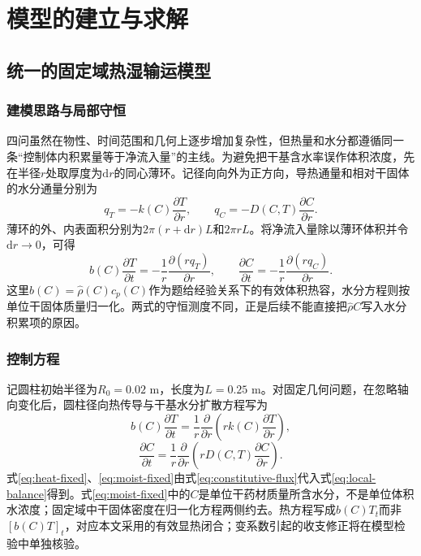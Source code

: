 \newpage
\section{模型的建立与求解}

\subsection{统一的固定域热湿输运模型}

\subsubsection{建模思路与局部守恒}

四问虽然在物性、时间范围和几何上逐步增加复杂性，但热量和水分都遵循同一条“控制体内积累量等于净流入量”的主线。为避免把干基含水率误作体积浓度，先在半径$r$处取厚度为$\mathrm dr$的同心薄环。记径向向外为正方向，导热通量和相对干固体的水分通量分别为
\begin{equation}
q_T=-k(C)\frac{\partial T}{\partial r},\qquad
q_C=-D(C,T)\frac{\partial C}{\partial r}.
\label{eq:constitutive-flux}
\end{equation}
薄环的外、内表面积分别为$2\pi(r+\mathrm dr)L$和$2\pi rL$。将净流入量除以薄环体积并令$\mathrm dr\to0$，可得
\begin{equation}
b(C)\frac{\partial T}{\partial t}
=-\frac{1}{r}\frac{\partial(rq_T)}{\partial r},\qquad
\frac{\partial C}{\partial t}
=-\frac{1}{r}\frac{\partial(rq_C)}{\partial r}.
\label{eq:local-balance}
\end{equation}
这里$b(C)=\hat\rho(C)c_p(C)$作为题给经验关系下的有效体积热容，水分方程则按单位干固体质量归一化。两式的守恒测度不同，正是后续不能直接把$\hat\rho C$写入水分积累项的原因。

\subsubsection{控制方程}

记圆柱初始半径为$R_0=0.02$ m，长度为$L=0.25$ m。对固定几何问题，在忽略轴向变化后，圆柱径向热传导与干基水分扩散方程写为
\begin{equation}
 b(C)\frac{\partial T}{\partial t}
 =\frac{1}{r}\frac{\partial}{\partial r}
 \left(rk(C)\frac{\partial T}{\partial r}\right),
 \label{eq:heat-fixed}
\end{equation}
\begin{equation}
 \frac{\partial C}{\partial t}
 =\frac{1}{r}\frac{\partial}{\partial r}
 \left(rD(C,T)\frac{\partial C}{\partial r}\right).
 \label{eq:moist-fixed}
\end{equation}
式\eqref{eq:heat-fixed}、\eqref{eq:moist-fixed}由式\eqref{eq:constitutive-flux}代入式\eqref{eq:local-balance}得到。式\eqref{eq:moist-fixed}中的$C$是单位干药材质量所含水分，不是单位体积水浓度；固定域中干固体密度在归一化方程两侧约去。热方程写成$b(C)T_t$而非$[b(C)T]_t$，对应本文采用的有效显热闭合；变系数引起的收支修正将在模型检验中单独核验。

